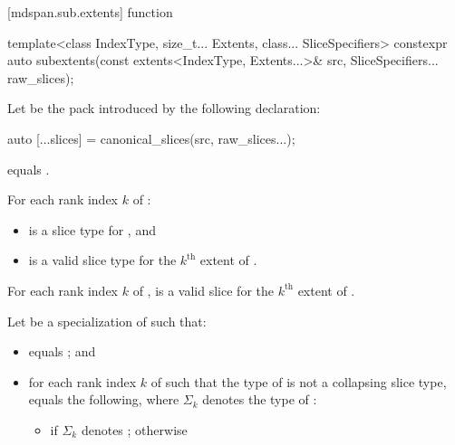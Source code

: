 [mdspan.sub.extents]{ function}

%
\begin{itemdecl}
template<class IndexType, size_t... Extents, class... SliceSpecifiers>
  constexpr auto subextents(const extents<IndexType, Extents...>& src,
                            SliceSpecifiers... raw_slices);
\end{itemdecl}

\begin{itemdescr}
\pnum
Let  be the pack introduced by the following declaration:
\begin{codeblock}
auto [...slices] = canonical_slices(src, raw_slices...);
\end{codeblock}

\pnum
\constraints
{} equals .

\pnum
\mandates
For each rank index $k$ of :
\begin{itemize}
\item
  is a  slice type for , and
\item
   is a valid  slice type
  for the $k^\text{th}$ extent of .
\end{itemize}

\pnum
\expects
For each rank index $k$ of ,
 is a valid  slice
for the $k^\text{th}$ extent of .

\pnum
Let  be a specialization of  such that:

\begin{itemize}
\item
{} equals
; and

\item
for each rank index $k$ of  such that
the type of  is not a collapsing slice type,
equals the following, where $\Sigma_k$
denotes the type of :

  \begin{itemize}
  \item
  if $\Sigma_k$ denotes ;
  otherwise


\end{itemize}
\end{itemize}
\end{itemdescr}
